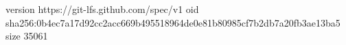 version https://git-lfs.github.com/spec/v1
oid sha256:0b4ec7a17d92cc2acc669b495518964de0e81b80985cf7b2db7a20fb3ae13ba5
size 35061
